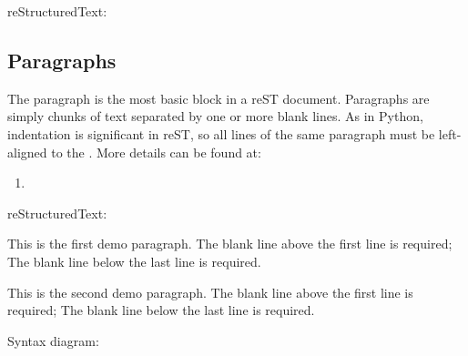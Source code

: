 \documentclass[letterpaper,12pt,english]{sphinxmanual}
\begin{document}
reStructuredText:

\begin{sphinxVerbatim}[commandchars=\\\{\}]


\end{sphinxVerbatim}


\subsection{Paragraphs}
\label{\detokenize{rtxt:paragraphs}}
The paragraph is the most basic block in a reST document.
Paragraphs are simply chunks of text separated by one or
more blank lines. As in Python, indentation is significant
in reST, so all lines of the same paragraph must be
left-aligned to the . More
details can be found at: 
\begin{enumerate}
\def\theenumi{\arabic{enumi}}
\def\labelenumi{\theenumi .}
\makeatletter\def\p@enumii{\p@enumi \theenumi .}\makeatother
\item {} 

\end{enumerate}

reStructuredText:

\begin{sphinxVerbatim}[commandchars=\\\{\}]
This is the first demo paragraph. The blank line above
the first line is required; The blank line below the last
line is required.

This is the second demo paragraph. The blank line above
the first line is required; The blank line below the last
line is required.
\end{sphinxVerbatim}

Syntax diagram:
\end{document}
